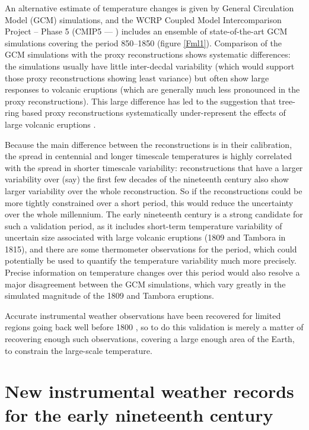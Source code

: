 \documentclass[CP]{copernicus}
\begin{document}
An alternative estimate of temperature changes is given by General Circulation Model (GCM) simulations, and the WCRP Coupled Model Intercomparison Project – Phase 5 (CMIP5 --- \citet{taylor12cmip5}) includes an ensemble of state-of-the-art GCM simulations covering the period 850--1850 (figure \ref{Fml1}). Comparison of the GCM simulations with the proxy reconstructions shows systematic differences: the simulations usually have little inter-decdal variability (which would support those proxy reconstructions showing least variance) but often show large responses to volcanic eruptions (which are generally much less pronounced in the proxy reconstructions). This large difference has led to the suggestion that tree-ring based proxy reconstructions systematically under-represent the effects of large volcanic eruptions \citep{mann12volctreering}.

Because the main difference between the reconstructions is in their calibration, the spread in centennial and longer timescale temperatures is highly correlated with the spread in shorter timescale variability: reconstructions that have a larger variability over (say) the first few decades of the nineteenth century also show larger variability over the whole reconstruction. So if the reconstructions could be more tightly constrained over a short period, this would reduce the uncertainty over the whole millennium. The early nineteenth century is a strong candidate for such a validation period, as it includes short-term temperature variability of uncertain size associated with large volcanic eruptions (1809 and Tambora in 1815), and there are some thermometer observations for the period, which could potentially be used to quantify the temperature variability much more precisely. Precise information on temperature changes over this period would also resolve a major disagreement between the GCM simulations, which vary greatly in the simulated magnitude of the 1809 and Tambora eruptions.

Accurate instrumental weather observations have been recovered for limited regions going back well before 1800 \citep{camuffo11medici,alcoforado12portobs}, so to do this validation is merely a matter of recovering enough such observations, covering a large enough area of the Earth, to constrain the large-scale temperature.

\section{New instrumental weather records for the early nineteenth century}
\end{document}
